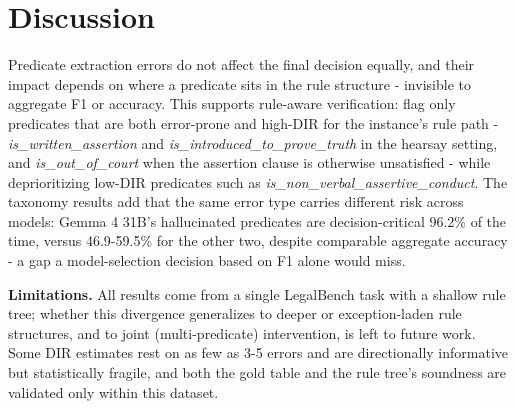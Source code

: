 \section{Discussion}
\label{sec:discussion}

Predicate extraction errors do not affect the final decision equally, and their impact depends on where a predicate sits in the rule structure - invisible to aggregate F1 or accuracy. This supports rule-aware verification: flag only predicates that are both error-prone and high-DIR for the instance's rule path - \textit{is\_written\_assertion} and \textit{is\_introduced\_to\_prove\_truth} in the hearsay setting, and \textit{is\_out\_of\_court} when the assertion clause is otherwise unsatisfied - while deprioritizing low-DIR predicates such as \textit{is\_non\_verbal\_assertive\_conduct}. The taxonomy results add that the same error type carries different risk across models: Gemma 4 31B's hallucinated predicates are decision-critical 96.2\% of the time, versus 46.9-59.5\% for the other two, despite comparable aggregate accuracy - a gap a model-selection decision based on F1 alone would miss.

\textbf{Limitations.} All results come from a single LegalBench task with a shallow rule tree; whether this divergence generalizes to deeper or exception-laden rule structures, and to joint (multi-predicate) intervention, is left to future work. Some DIR estimates rest on as few as 3-5 errors and are directionally informative but statistically fragile, and both the gold table and the rule tree's soundness are validated only within this dataset.

